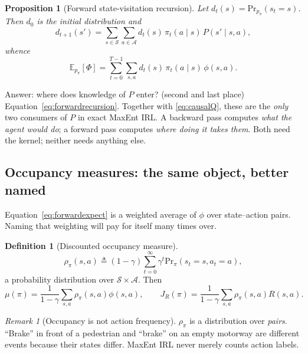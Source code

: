 \documentclass[11pt]{article}
\theoremstyle{plain}
\newtheorem{proposition}[theorem]{Proposition}
\theoremstyle{definition}
\newtheorem{definition}[theorem]{Definition}
\theoremstyle{remark}
\newtheorem{remark}[theorem]{Remark}
\renewcommand{\S}{\mathcal{S}}
\newcommand{\A}{\mathcal{A}}
\newcommand{\E}{\mathbb{E}}
\newcommand{\Prb}{\mathrm{Pr}}
\begin{document}
\begin{proposition}[Forward state-visitation recursion]
Let $d_t(s) = \Prb_{p_\pi}(s_t=s)$. Then $d_0$ is the initial distribution
and
\begin{equation}
d_{t+1}(s') = \sum_{s\in\S}\sum_{a\in\A} d_t(s)\,\pi_t(a\mid s)\,P(s'\mid s,a),
\label{eq:forwardrecursion}
\end{equation}
whence
\begin{equation}
\E_{p_\pi}[\Phi] = \sum_{t=0}^{T-1}\sum_{s,a} d_t(s)\,\pi_t(a\mid s)\,\phi(s,a).
\label{eq:forwardexpect}
\end{equation}
\end{proposition}

\begin{graybox}{Answer: where does knowledge of $P$ enter? (second and
last place)}
Equation~\eqref{eq:forwardrecursion}. Together with \eqref{eq:causalQ},
these are the \emph{only} two consumers of $P$ in exact MaxEnt IRL. A
backward pass computes \emph{what the agent would do}; a forward pass
computes \emph{where doing it takes them}. Both need the kernel; neither
needs anything else.
\end{graybox}

\subsection{Occupancy measures: the same object, better named}
\label{sec:occupancy}

Equation~\eqref{eq:forwardexpect} is a weighted average of $\phi$ over
state--action pairs. Naming that weighting will pay for itself many times
over.

\begin{definition}[Discounted occupancy measure]
\begin{equation}
\rho_\pi(s,a) \triangleq (1-\gamma)\sum_{t=0}^\infty \gamma^t \Prb_\pi(s_t=s,a_t=a),
\label{eq:occupancydef}
\end{equation}
a probability distribution over $\S\times\A$. Then
\begin{equation}
\mu(\pi) = \frac1{1-\gamma}\sum_{s,a}\rho_\pi(s,a)\phi(s,a), \qquad
J_R(\pi) = \frac1{1-\gamma}\sum_{s,a}\rho_\pi(s,a)R(s,a).
\label{eq:occupancylinear}
\end{equation}
\end{definition}

\begin{remark}[Occupancy is not action frequency]
$\rho_\pi$ is a distribution over \emph{pairs}. ``Brake'' in front of a
pedestrian and ``brake'' on an empty motorway are different events because
their states differ. MaxEnt IRL never merely counts action labels.
\end{remark}
\end{document}
